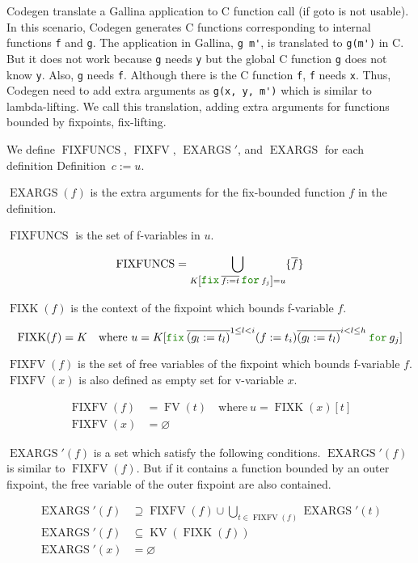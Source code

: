 \documentclass[a4paper,fleqn]{article}
\def\gallina{\textrm{Gallina}}
\def\codegen{\textrm{Codegen}}
\newcommand{\kwDefinition}{\mbox{\color{myviolet}\ttfamily Definition}}
\newcommand{\kwfix}{\mbox{\color{mygreen}\ttfamily fix}}
\newcommand{\kwfor}{\mbox{\color{mygreen}\ttfamily for}}
\newcommand{\ofix}[2]{\kwfix\:{#1}\:\kwfor\:{#2}}
\DeclareMathOperator{\FV}{FV}
\DeclareMathOperator{\KV}{KV}
\DeclareMathOperator{\FIXFUNCS}{FIXFUNCS}
\DeclareMathOperator{\FIXK}{FIXK}
\DeclareMathOperator{\FIXFV}{FIXFV}
\DeclareMathOperator{\EXARGS}{EXARGS}
\newcommand{\kwgoto}{\mbox{\color{myviolet}\ttfamily goto}}
\newcommand{\rep}[1]{\overline{#1}}
\newcommand{\repi}[2]{\overline{#1}^{#2}}
\begin{document}
\codegen{} translate a \gallina{} application to C function call (if \kwgoto{} is not usable).
In this scenario, \codegen{} generates C functions corresponding to internal functions \lstinline[style=Cstyle]!f! and \lstinline[style=Cstyle]!g!.
The application in \gallina{}, \lstinline!g m'!, is translated to \lstinline[style=Cstyle]!g(m')! in C.
But it does not work because \lstinline!g! needs \lstinline!y! but the global C function \lstinline[style=Cstyle]!g! does not know \lstinline!y!.
Also, \lstinline!g! needs \lstinline!f!.
Although there is the C function \lstinline!f!, \lstinline!f! needs \lstinline!x!.
Thus, \codegen{} need to add extra arguments as \lstinline[style=Cstyle]!g(x, y, m')! which is similar to lambda-lifting.
We call this translation, adding extra arguments for functions bounded by fixpoints, fix-lifting.

We define $\FIXFUNCS$, $\FIXFV$, $\EXARGS'$, and $\EXARGS$ for each definition \kwDefinition~$c := u$.

$\EXARGS(f)$ is the extra arguments for the fix-bounded function $f$ in the definition.

$\FIXFUNCS$ is the set of f-variables in $u$.

\[
  \FIXFUNCS = \bigcup_{K\left[\ofix{\rep{f:=t}}{f_j}\right] = u} \{\rep{f}\}
\]

$\FIXK(f)$ is the context of the fixpoint which bounds f-variable $f$.

\[
  \FIXK(f) = K \quad \text{where}~u = K[\ofix{\repi{(g_l:=t_l)}{1\leq l < i} (f:=t_i) \repi{(g_l:=t_l)}{i < l \leq h}}{g_j}]  \\
\]

$\FIXFV(f)$ is the set of free variables of the fixpoint which bounds f-variable $f$.
$\FIXFV(x)$ is also defined as empty set for v-variable $x$.

\begin{align*}
  \FIXFV(f) &= \FV(t) \quad \text{where}~u = \FIXK(x)[t] \\
  \FIXFV(x) &= \varnothing
\end{align*}

$\EXARGS'(f)$ is a set which satisfy the following conditions.
$\EXARGS'(f)$ is similar to $\FIXFV(f)$.
But if it contains a function bounded by an outer fixpoint, the free variable of the outer fixpoint are also contained.

\begin{align*}
  \EXARGS'(f) &\supseteq \FIXFV(f) \cup \bigcup_{t \in \FIXFV(f)} \EXARGS'(t) \\
  \EXARGS'(f) &\subseteq \KV(\FIXK(f)) \\
  \EXARGS'(x) &= \varnothing
\end{align*}
\end{document}
